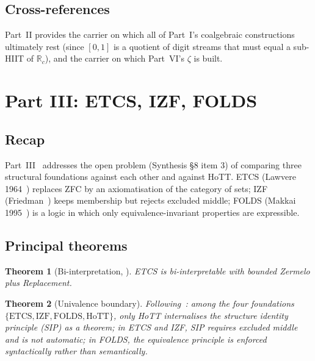 \documentclass[12pt]{article}
\newtheorem{theorem}{Theorem}[section]
\theoremstyle{definition}
\theoremstyle{remark}
\newcommand{\R}{\mathbb{R}}
\newcommand{\Rc}{\R_{c}}
\begin{document}
\subsection{Cross-references}

Part~II provides the carrier on which all of Part~I's coalgebraic
constructions ultimately rest (since $[0,1]$ is a quotient of digit
streams that must equal a sub-HIIT of $\Rc$), and the carrier on which
Part~VI's $\zeta$ is built.

\section{Part III: ETCS, IZF, FOLDS}\label{sec:partIII}

\subsection{Recap}

Part~III~\cite{etcsIzfFolds} addresses the open problem (Synthesis \S 8
item 3) of comparing three structural foundations against each other and
against HoTT\@. ETCS (Lawvere 1964~\cite{Lawvere1964}) replaces ZFC by an
axiomatisation of the category of sets; IZF (Friedman~\cite{Friedman1973})
keeps membership but rejects excluded middle; FOLDS (Makkai
1995~\cite{Makkai1995}) is a logic in which only equivalence-invariant
properties are expressible.

\subsection{Principal theorems}

\begin{theorem}[Bi-interpretation, \cite{McLarty2004}]
ETCS is bi-interpretable with bounded Zermelo plus Replacement.
\end{theorem}

\begin{theorem}[Univalence boundary]
Following~\cite[\S 6]{etcsIzfFolds}: among the four foundations
$\{\text{ETCS}, \text{IZF}, \text{FOLDS}, \text{HoTT}\}$, only HoTT
internalises the structure identity principle (SIP) as a theorem; in
ETCS and IZF, SIP requires excluded middle and is not automatic; in
FOLDS, the equivalence principle is enforced syntactically rather than
semantically.
\end{theorem}
\end{document}
